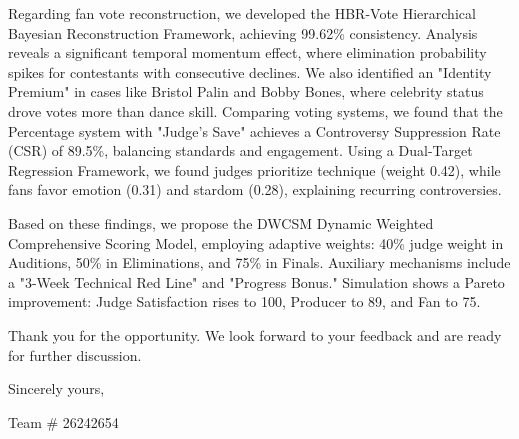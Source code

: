 \documentclass{mcmthesis}
\begin{document}
Regarding fan vote reconstruction, we developed the HBR-Vote Hierarchical Bayesian Reconstruction Framework, achieving 99.62\% consistency. Analysis reveals a significant temporal momentum effect, where elimination probability spikes for contestants with consecutive declines. We also identified an "Identity Premium" in cases like Bristol Palin and Bobby Bones, where celebrity status drove votes more than dance skill. Comparing voting systems, we found that the Percentage system with "Judge's Save" achieves a Controversy Suppression Rate (CSR) of 89.5\%, balancing standards and engagement. Using a Dual-Target Regression Framework, we found judges prioritize technique (weight 0.42), while fans favor emotion (0.31) and stardom (0.28), explaining recurring controversies.

Based on these findings, we propose the DWCSM Dynamic Weighted Comprehensive Scoring Model, employing adaptive weights: 40\% judge weight in Auditions, 50\% in Eliminations, and 75\% in Finals. Auxiliary mechanisms include a "3-Week Technical Red Line" and "Progress Bonus." Simulation shows a Pareto improvement: Judge Satisfaction rises to 100, Producer to 89, and Fan to 75.

Thank you for the opportunity. We look forward to your feedback and are ready for further discussion.

\vspace{2em}

\hfill Sincerely yours,

\hfill Team \# 26242654


\newpage
\renewcommand{\refname}{References} %
\end{document}
